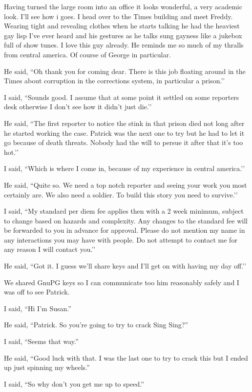 Having turned the large room into an office it looks wonderful, a very academic look. I’ll see how i goes. I head over to the Times building and meet Freddy. Wearing tight and revealing clothes when he starts talking he had the heaviest gay lisp I’ve ever heard and his gestures as he talks sung gayness like a jukebox full of show tunes. I love this guy already. He reminds me so much of my thralls from central america. Of course of George in particular.

He said, ``Oh thank you for coming dear. There is this job floating around in the Times about corruption in the corrections system, in particular a prison.’’

I said, ``Sounds good. I assume that at some point it settled on some reporters desk otherwise I don’t see how it didn’t just die.’’

He said, ``The first reporter to notice the stink in that prison died not long after he started working the case. Patrick was the next one to try but he had to let it go because of death threats. Nobody had the will to persue it after that it’s too hot.’’

I said, ``Which is where I come in, because of my experience in central america.’’

He said, ``Quite so. We need a top notch reporter and seeing your work you most certainly are. We also need a soldier. To build this story you need to survive.’’

I said, ``My standard per diem fee applies then with a 2 week minimum, subject to change based on hazards and complexity. Any changes to the standard fee will be forwarded to you in advance for approval. Please do not mention my name in any interactions you may have with people. Do not attempt to contact me for any reason I will contact you.’’

He said, ``Got it. I guess we’ll share keys and I’ll get on with having my day off.’’

We shared GnuPG keys so I can communicate too him reasonably safely and I was off to see Patrick.

I said, ``Hi I'm Susan.''

He said, ``Patrick. So you're going to try to crack Sing Sing?''

I said, ``Seems that way.''

He said, ``Good luck with that. I was the last one to try to crack this but I ended up just spinning my wheels.''

I said, ``So why don't you get me up to speed.''

